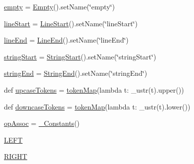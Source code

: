 \begin{DoxyCompactItemize}
\item 
\hyperlink{namespacepkg__resources_1_1__vendor_1_1pyparsing_aa9aca95afe3d4bf7006482c44c276711}{empty} = \hyperlink{classpkg__resources_1_1__vendor_1_1pyparsing_1_1_empty}{Empty}().set\+Name(\char`\"{}empty\char`\"{})
\item 
\hyperlink{namespacepkg__resources_1_1__vendor_1_1pyparsing_a674038ebca8adc1d1745ddc3fe507b9a}{line\+Start} = \hyperlink{classpkg__resources_1_1__vendor_1_1pyparsing_1_1_line_start}{Line\+Start}().set\+Name(\char`\"{}line\+Start\char`\"{})
\item 
\hyperlink{namespacepkg__resources_1_1__vendor_1_1pyparsing_a3468b0899db3ec11a22f8069c6cbcdfa}{line\+End} = \hyperlink{classpkg__resources_1_1__vendor_1_1pyparsing_1_1_line_end}{Line\+End}().set\+Name(\char`\"{}line\+End\char`\"{})
\item 
\hyperlink{namespacepkg__resources_1_1__vendor_1_1pyparsing_aa8834aba17ca691a8e786295ec09656f}{string\+Start} = \hyperlink{classpkg__resources_1_1__vendor_1_1pyparsing_1_1_string_start}{String\+Start}().set\+Name(\char`\"{}string\+Start\char`\"{})
\item 
\hyperlink{namespacepkg__resources_1_1__vendor_1_1pyparsing_a6c08bd888d62aae6dd4f568f31cd6ad4}{string\+End} = \hyperlink{classpkg__resources_1_1__vendor_1_1pyparsing_1_1_string_end}{String\+End}().set\+Name(\char`\"{}string\+End\char`\"{})
\item 
def \hyperlink{namespacepkg__resources_1_1__vendor_1_1pyparsing_a43a04e1b2893f19ce7c95d93e11fbc39}{upcase\+Tokens} = \hyperlink{namespacepkg__resources_1_1__vendor_1_1pyparsing_a0a9787e7472183e7a432272c6769c90c}{token\+Map}(lambda t\+: \+\_\+ustr(t).upper())
\item 
def \hyperlink{namespacepkg__resources_1_1__vendor_1_1pyparsing_a722c1fb0d1724d553d5ca69ab34c2f39}{downcase\+Tokens} = \hyperlink{namespacepkg__resources_1_1__vendor_1_1pyparsing_a0a9787e7472183e7a432272c6769c90c}{token\+Map}(lambda t\+: \+\_\+ustr(t).lower())
\item 
\hyperlink{namespacepkg__resources_1_1__vendor_1_1pyparsing_ade0f508126813e998bf41f155ffc1916}{op\+Assoc} = \hyperlink{classpkg__resources_1_1__vendor_1_1pyparsing_1_1___constants}{\+\_\+\+Constants}()
\item 
\hyperlink{namespacepkg__resources_1_1__vendor_1_1pyparsing_acd7f2dfd9e0f0720ef339834488a6f36}{L\+E\+FT}
\item 
\hyperlink{namespacepkg__resources_1_1__vendor_1_1pyparsing_aa180ab3faaf92810a4fa34e069d8507c}{R\+I\+G\+HT}
\item 

\end{DoxyCompactItemize}
